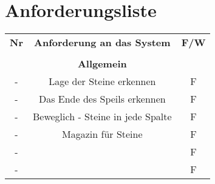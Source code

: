 	\chapter*{Anforderungsliste}
	\begin{table}[hbt]
	\centering
	\label{Anforderungsliste}
	\begin{tabular}{ccc}
		\textbf{Nr} & \textbf{Anforderung an das System} & \textbf{F/W} \\
		\textbf{} & \textbf{}& \textbf{}  \\
		\hline
		\hline
		\textbf{} & \textbf{Allgemein}& \textbf{}  \\
		\hline
		\hline
		- & Lage der Steine erkennen & F\\
		\hline
		- & Das Ende des Speils erkennen & F\\
		\hline
		- & Beweglich - Steine in jede Spalte	& F\\
		\hline
		- &Magazin für Steine  & F\\
		\hline
		- &  & F\\
		\hline
		- &  & F\\
		\hline
		
	\end{tabular}
\end{table}
